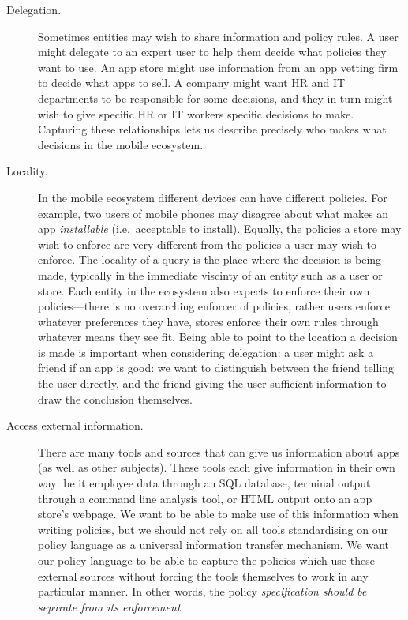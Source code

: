 \documentclass[thesis.tex]{subfiles}
\begin{document}
\begin{description}
\item[Delegation.] Sometimes entities may wish to
share information and policy rules. A user might delegate to an
expert user to help them decide what policies they want to use. An app
store might use information from an app vetting firm to decide what
apps to sell. A company might want HR and IT departments to be
responsible for some decisions, and they in turn might wish to give
specific HR or IT workers specific decisions to make. Capturing these
relationships lets us describe precisely who makes what decisions in
the mobile ecosystem.

\item[Locality.] In the mobile ecosystem different devices can have
different policies. For example, two users of mobile phones may
disagree about what makes an app \emph{installable}
(i{.}e{.}~acceptable to install). Equally, the policies a store may
wish to enforce are very different from the policies a user may wish
to enforce. The locality of a query is the place where the decision is being made, typically in the immediate viscinty of an entity such as a user or store. Each entity in the ecosystem also expects to enforce their
own policies---there is no overarching enforcer of policies, rather
users enforce whatever preferences they have, stores enforce their own
rules through whatever means they see fit. Being able to point to the
location a decision is made is important when considering delegation:
a user might ask a friend if an app is good: we want to distinguish
between the friend telling the user directly, and the friend giving
the user sufficient information to draw the conclusion themselves.

\item[Access external information.] There are many tools and sources
that can give us information about apps (as well as other
subjects). These tools each give information in their own way: be it
employee data through an SQL database, terminal output through a
command line analysis tool, or HTML output onto an app store's
webpage. We want to be able to make use of this information when
writing policies, but we should not rely on all tools standardising on
our policy language as a universal information transfer mechanism. We
want our policy language to be able to capture the policies which use
these external sources without forcing the tools themselves to work in
any particular manner. In other words, the policy \emph{specification
should be separate from its enforcement}.


\end{description}
\end{document}
